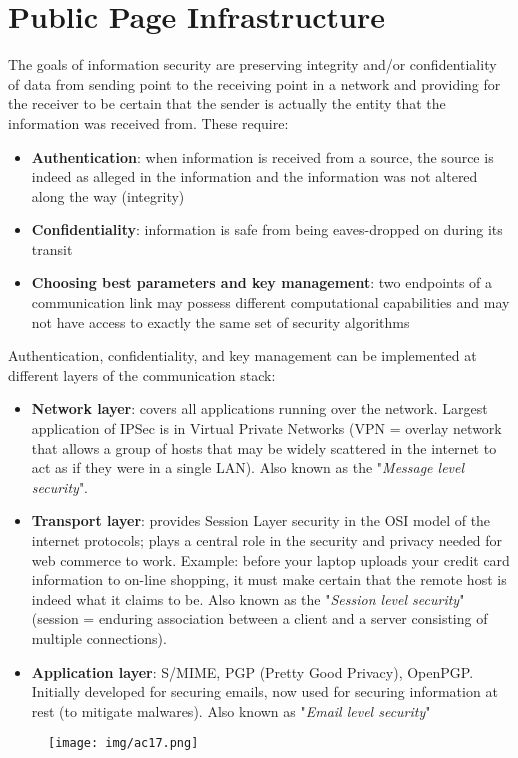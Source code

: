 \documentclass[a4paper, 10pt, titlepage]{article}
\begin{document}
\newpage
\section{Public Page Infrastructure}
The goals of information security are preserving integrity and/or confidentiality of data from sending point to the receiving point in a network and providing for the receiver to be certain that the sender is actually the entity that the information was received from.
These require:
\begin{itemize}
\item \textbf{Authentication}: when information is received from a source, the source is indeed as alleged in the information and the information was not altered along the way (integrity)
\item \textbf{Confidentiality}: information is safe from being eaves-dropped on during its transit
\item \textbf{Choosing best parameters and key management}: two endpoints of a communication link may possess different computational capabilities and may not have access to exactly the same set of security algorithms
\end{itemize}
Authentication, confidentiality, and key management can be implemented at different layers of the communication stack:
\begin{itemize}
\item \textbf{Network layer}: covers all applications running over the network. Largest application of IPSec is in Virtual Private Networks (VPN = overlay network that allows a group of hosts that may be widely scattered in the internet to act as if they were in a single LAN). Also known as the "\textit{Message level security}".
\item \textbf{Transport layer}: provides Session Layer security in the OSI model of the internet protocols; plays a central role in the security and privacy needed for web commerce to work. Example: before your laptop uploads your credit card information to on-line shopping, it must make certain that the remote host is indeed what it claims to be. Also known as the "\textit{Session level security}" (session = enduring association between a client and a server consisting of multiple connections).
\item \textbf{Application layer}: S/MIME, PGP (Pretty Good Privacy), OpenPGP. Initially developed for securing emails, now used for securing information at rest (to mitigate malwares). Also known as "\textit{Email level security}"
\end{itemize}
\begin{figure}[h]
\centering
\texttt{[image: img/ac17.png]}
\end{figure}
\end{document}
